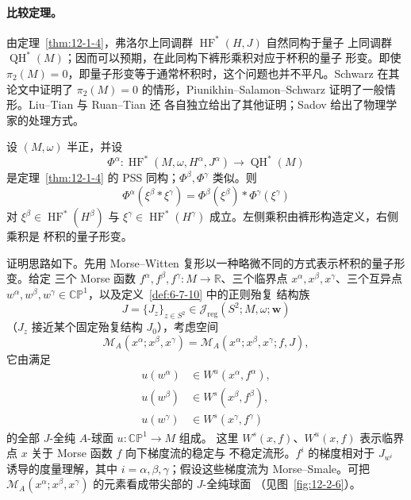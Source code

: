 \paragraph{比较定理。}
由定理~\ref{thm:12-1-4}，弗洛尔上同调群 $\operatorname{HF}^*(H,J)$ 自然同构于量子
上同调群 $\operatorname{QH}^*(M)$；因而可以预期，在此同构下裤形乘积对应于杯积的量子
形变。即使 $\pi_2(M)=0$，即量子形变等于通常杯积时，这个问题也并不平凡。Schwarz
 在其论文中证明了 $\pi_2(M)=0$ 的情形，Piunikhin--Salamon--Schwarz
 证明了一般情形。Liu--Tian  与 Ruan--Tian  还
各自独立给出了其他证明；Sadov  给出了物理学家的处理方式。

\begin{theorem}\label{thm:12-2-1}
设 $(M,\omega)$ 半正，并设
\[
  \Phi^\alpha:\operatorname{HF}^*(M,\omega,H^\alpha,J^\alpha)
  \longrightarrow\operatorname{QH}^*(M)
\]
是定理~\ref{thm:12-1-4} 的 PSS 同构；$\Phi^\beta,\Phi^\gamma$ 类似。则
\[
  \Phi^\alpha(\xi^\beta*\xi^\gamma)
  =\Phi^\beta(\xi^\beta)*\Phi^\gamma(\xi^\gamma)
\]
对 $\xi^\beta\in\operatorname{HF}^*(H^\beta)$ 与
$\xi^\gamma\in\operatorname{HF}^*(H^\gamma)$ 成立。左侧乘积由裤形构造定义，右侧乘积是
杯积的量子形变。
\end{theorem}

证明思路如下。先用 Morse--Witten 复形以一种略微不同的方式表示杯积的量子形变。给定
三个 Morse 函数 $f^\alpha,f^\beta,f^\gamma:M\to\mathbb R$、三个临界点
$x^\alpha,x^\beta,x^\gamma$、三个互异点
$w^\alpha,w^\beta,w^\gamma\in\mathbb{CP}^1$，以及定义~\ref{def:6-7-10} 中的正则殆复
结构族
\[
  J=\{J_z\}_{z\in S^2}\in
  \mathcal J_{\mathrm{reg}}(S^2;M,\omega;\mathbf w)
\]
（$J_z$ 接近某个固定殆复结构 $J_0$），考虑空间
\[
  \mathcal M_A(x^\alpha;x^\beta,x^\gamma)
  =\mathcal M_A(x^\alpha;x^\beta,x^\gamma;f,J),
\]
它由满足
\[
\begin{split}
  u(w^\alpha)&\in W^u(x^\alpha,f^\alpha),\\
  u(w^\beta)&\in W^s(x^\beta,f^\beta),\\
  u(w^\gamma)&\in W^s(x^\gamma,f^\gamma)
\end{split}
\]
的全部 $J$-全纯 $A$-球面 $u:\mathbb{CP}^1\to M$ 组成。
这里 $W^s(x,f)$、$W^u(x,f)$ 表示临界点 $x$ 关于 Morse 函数 $f$ 向下梯度流的稳定与
不稳定流形。$f^i$ 的梯度相对于 $J_{w^i}$ 诱导的度量理解，其中
$i=\alpha,\beta,\gamma$；假设这些梯度流为 Morse--Smale。可把
$\mathcal M_A(x^\alpha;x^\beta,x^\gamma)$ 的元素看成带尖部的 $J$-全纯球面
（见图~\ref{fig:12-2-6}）。

